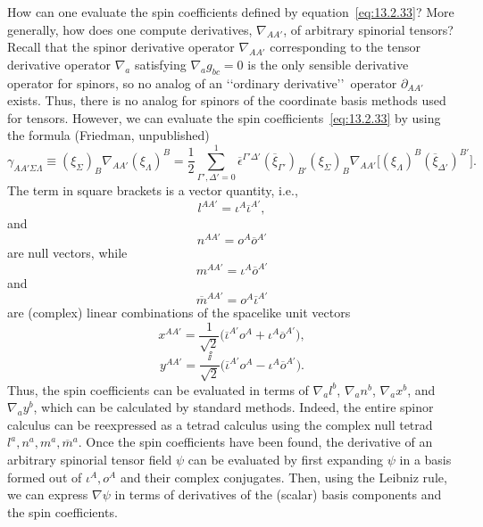 How can one evaluate the spin coefficients defined by equation~\eqref{eq:13.2.33}?
More generally, how does one compute derivatives, \(\nabla_{AA'}\), of arbitrary
spinorial tensors? Recall that the spinor derivative operator \(\nabla_{AA'}\)
corresponding to the tensor derivative operator \(\nabla_a\) satisfying
\(\nabla_a g_{bc}=0\) is the only sensible derivative operator for spinors, so no
analog of an \lq\lq ordinary derivative\rq\rq\ operator \(\partial_{AA'}\) exists.
Thus, there is no analog for spinors of the coordinate basis methods used for
tensors. However, we can
evaluate the spin coefficients~\eqref{eq:13.2.33} by using the formula (Friedman,
unpublished)
\begin{equation}
  \gamma_{AA'\Sigma\Lambda}
  \equiv(\xi_\Sigma)_B\nabla_{AA'}(\xi_\Lambda)^B
  =\frac12\sum_{\Gamma',\Delta'=0}^1
    \overline\epsilon^{\Gamma'\Delta'}(\overline\xi_{\Gamma'})_{B'}
    (\xi_\Sigma)_B\nabla_{AA'}
    \bigl[(\xi_\Lambda)^B(\overline\xi_{\Delta'})^{B'}\bigr].
  \tag{13.2.34}\label{eq:13.2.34}
\end{equation}
The term in square brackets is a vector quantity, i.e.,
\begin{equation}
  l^{AA'}=\iota^A\overline\iota^{A'},
  \tag{13.2.35}\label{eq:13.2.35}
\end{equation}
and
\begin{equation}
  n^{AA'}=o^A\overline o^{A'}
  \tag{13.2.36}\label{eq:13.2.36}
\end{equation}
are null vectors, while
\begin{equation}
  m^{AA'}=\iota^A\overline o^{A'}
  \tag{13.2.37}\label{eq:13.2.37}
\end{equation}
and
\begin{equation}
  \overline m^{AA'}=o^A\overline\iota^{A'}
  \tag{13.2.38}\label{eq:13.2.38}
\end{equation}
are (complex) linear combinations of the spacelike unit vectors
\begin{equation}
  x^{AA'}=\frac{1}{\sqrt2}
    \bigl(\overline\iota^{A'}o^A+\iota^A\overline o^{A'}\bigr),
  \tag{13.2.39}\label{eq:13.2.39}
\end{equation}
\begin{equation}
  y^{AA'}=\frac{\ii}{\sqrt2}
    \bigl(\overline\iota^{A'}o^A-\iota^A\overline o^{A'}\bigr).
  \tag{13.2.40}\label{eq:13.2.40}
\end{equation}
Thus, the spin coefficients can be evaluated in terms of
\(\nabla_a l^b\), \(\nabla_a n^b\), \(\nabla_a x^b\), and \(\nabla_a y^b\), which
can be calculated by standard methods. Indeed, the entire spinor calculus can be
reexpressed as a tetrad calculus using the complex null tetrad
\(l^a,n^a,m^a,\overline m^a\). Once the spin coefficients have been found, the
derivative of an arbitrary spinorial tensor field \(\psi\) can be evaluated by first
expanding \(\psi\) in a basis formed out of \(\iota^A,o^A\) and their complex
conjugates. Then, using the Leibniz rule, we can express \(\nabla\psi\) in terms of
derivatives of the (scalar) basis components and the spin coefficients.


